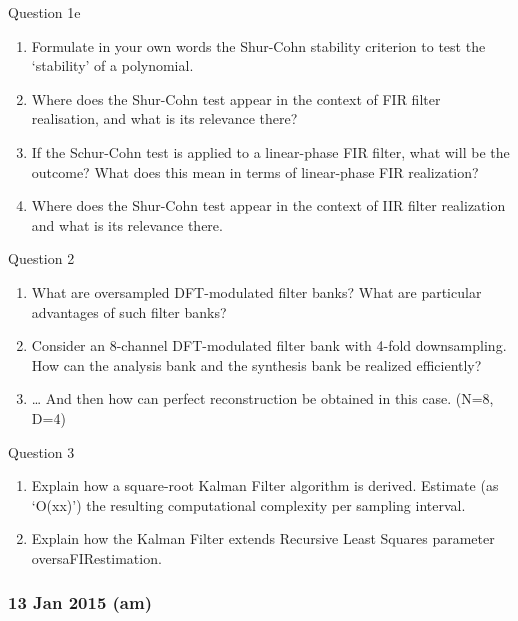 \documentclass[
  a4paper,
  ,captions=tableheading
]{scrartcl}
\providecommand{\tightlist}{%
  \setlength{\itemsep}{0pt}\setlength{\parskip}{0pt}}
\begin{document}
Question 1e

\begin{enumerate}
\def\labelenumi{\arabic{enumi}.}
\tightlist
\item
  Formulate in your own words the Shur-Cohn stability criterion to test
  the `stability' of a polynomial.\\
\item
  Where does the Shur-Cohn test appear in the context of FIR filter
  realisation, and what is its relevance there?\\
\item
  If the Schur-Cohn test is applied to a linear-phase FIR filter, what
  will be the outcome? What does this mean in terms of linear-phase FIR
  realization?\\
\item
  Where does the Shur-Cohn test appear in the context of IIR filter
  realization and what is its relevance there.
\end{enumerate}

Question 2

\begin{enumerate}
\def\labelenumi{\arabic{enumi}.}
\tightlist
\item
  What are oversampled DFT-modulated filter banks? What are particular
  advantages of such filter banks?\\
\item
  Consider an 8-channel DFT-modulated filter bank with 4-fold
  downsampling. How can the analysis bank and the synthesis bank be
  realized efficiently?\\
\item
  \ldots{} And then how can perfect reconstruction be obtained in this
  case. (N=8, D=4)
\end{enumerate}

Question 3

\begin{enumerate}
\def\labelenumi{\arabic{enumi}.}
\tightlist
\item
  Explain how a square-root Kalman Filter algorithm is derived. Estimate
  (as `O(xx)') the resulting computational complexity per sampling
  interval.\\
\item
  Explain how the Kalman Filter extends Recursive Least Squares
  parameter oversaFIRestimation.
\end{enumerate}

\subsubsection{\texorpdfstring{\textbf{13 Jan 2015
(am)}}{13 Jan 2015 (am)}}\label{jan-2015-am}
\end{document}
